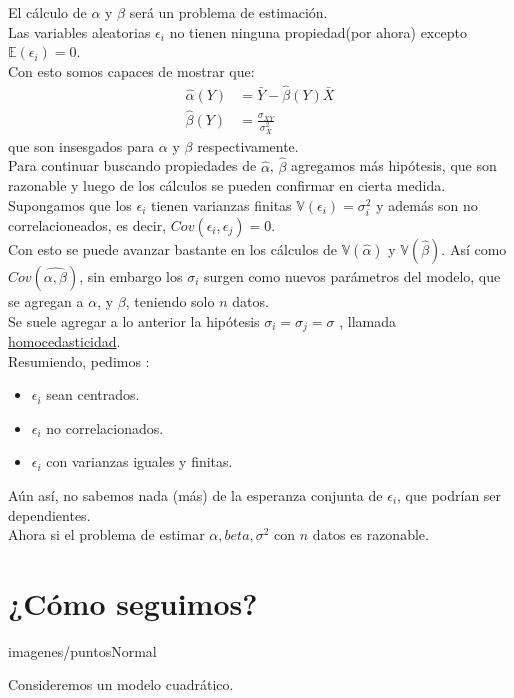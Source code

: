 \documentclass[10pt]{article}
\theoremstyle{plain}
\theoremstyle{definition}
\begin{document}
El cálculo de $\alpha$ y $\beta$ será un problema de estimación.\\
Las variables aleatorias $\epsilon_{i}$ no tienen ninguna propiedad(por ahora) excepto $\mathbb{E}(\epsilon_{i}) = 0$.\\
Con esto somos capaces de mostrar que:
\begin{align*}
\hat{\alpha}(Y) &= \bar{Y} - \hat{\beta}(Y)\bar{X}\\
\hat{\beta}(Y) &= \frac{\sigma_{XY}}{\sigma_{X}^2}
\end{align*}
que son insesgados para $\alpha$ y $\beta$ respectivamente.\\

Para continuar buscando propiedades de $\hat{\alpha}$, $\hat{\beta}$ agregamos más hipótesis, que son razonable y luego de los cálculos se pueden confirmar en cierta medida.\\

Supongamos que los $\epsilon_{i}$ tienen varianzas finitas $\mathbb{V}(\epsilon_{i}) = \sigma_{i}^2$ y además son no correlacioneados, es decir, $Cov(\epsilon_{i},\epsilon_{j}) = 0$.\\

Con esto se puede avanzar bastante en los cálculos de $\mathbb{V}(\hat{\alpha})$ y $\mathbb{V}(\hat{\beta})$. Así como $Cov(\hat{\alpha,\beta})$, sin embargo los $\sigma_{i}$ surgen como nuevos parámetros del modelo, que se agregan a $\alpha$, y $\beta$, teniendo solo $n$ datos.\\

Se suele agregar a lo anterior la hipótesis $\sigma_{i} = \sigma_{j} = \sigma$ , llamada \underline{homocedasticidad}.\\

Resumiendo, pedimos :
\begin{itemize}
\item $\epsilon_{i}$ sean centrados.
\item $\epsilon_{i}$ no correlacionados.
\item $\epsilon_{i}$ con varianzas iguales y finitas.
\end{itemize}
Aún así, no sabemos nada (más) de la esperanza conjunta de $\epsilon_{i}$, que podrían ser dependientes.\\

Ahora si el problema de estimar $\alpha,beta,\sigma^2$ con $n$ datos es razonable.\\

\section{¿Cómo seguimos?}
\begin{center}
imagenes/puntosNormal
\end{center}
Consideremos un modelo cuadrático.\\
\end{document}
